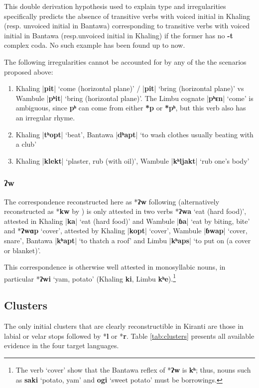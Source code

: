 \documentclass[oneside,a4paper,11pt]{article}
\newcommand{\ipa}[1]{\textbf{{\phon\mbox{#1}}}} %
\newcommand{\dhatu}[2]{|\ipa{#1}| `#2'}
\begin{document}
 This double derivation hypothesis used to explain type  and irregularities specifically predicts the absence of transitive verbs with voiced initial in Khaling (resp. unvoiced initial in Bantawa) corresponding to transitive verbs with voiced initial in Bantawa (resp.unvoiced initial in Khaling) if the former has no \ipa{-t} complex coda. No such example has been found up to now.
 
The following irregularities cannot be accounted for by any of the the scenarios proposed above:

\begin{enumerate}
\item  Khaling \dhatu{pit}{come (horizontal plane)} / \dhatu{pit}{bring (horizontal plane)} vs Wambule \dhatu{pʰit}{bring (horizontal plane)}. The Limbu cognate \dhatu{pʰɛn}{come}	is ambiguous, since \ipa{pʰ} can come from either \ipa{*p} or \ipa{*pʰ}, but this verb also has an irregular rhyme. 
\item Khaling  \dhatu{tʰopt}{beat}, Bantawa \dhatu{dʰapt}{to wash clothes usually beating with a club}
\item Khaling  \dhatu{klekt}{plaster, rub (with oil)}, Wambule \dhatu{kʰljakt}{rub one's body}
 \end{enumerate}

\subsubsection{\ipa{ʔw}}
The correspondence reconstructed here as *\ipa{ʔw} following \citet{michailovsky94stops} (alternatively reconstructed as *\ipa{kw} by \citet{opgenort04implosives}) is only attested in two verbs *\ipa{ʔwa} `eat (hard food)', attested in Khaling \dhatu{ka}{eat (hard food)} and Wambule \dhatu{ɓa}{eat by biting, bite} and  *\ipa{ʔwɑp} `cover', attested by  Khaling \dhatu{kopt}{cover}, Wambule \dhatu{ɓwap}{cover, snare}, Bantawa \dhatu{kʰapt}{to thatch a roof} and Limbu  \dhatu{kʰaps}{to put on (a cover or blanket)}. 
 
 This correspondence is otherwise well attested in monosyllabic nouns, in particular *\ipa{ʔwi} `yam, potato' (Khaling \ipa{ki}, Limbu \ipa{kʰe}).\footnote{The verb `cover' show that the Bantawa reflex of *\ipa{ʔw} is \ipa{kʰ}; thus, nouns such as \ipa{saki} `potato, yam' and \ipa{ogi} `sweet potato' must be borrowings.}


\subsection{Clusters} \label{sec:clusters}
The only initial clusters that are clearly reconstructible in Kiranti are those in labial or velar stops followed by *\ipa{l} or *\ipa{r}. Table \ref{tab:clusters} presents all available evidence in the four target languages.
\end{document}
